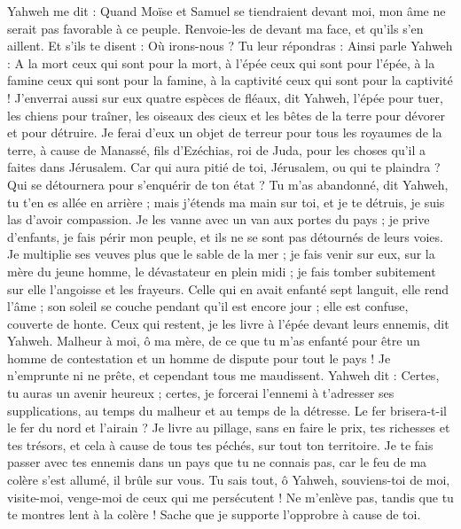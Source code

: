 \begin{multicols}{2}
\VerseOne{}Yahweh me dit : Quand Moïse et Samuel se tiendraient devant moi, mon âme ne serait pas favorable à ce peuple. Renvoie-les de devant ma face, et qu'ils s’en aillent.
Et s'ils te disent : Où irons-nous ? Tu leur répondras : Ainsi parle Yahweh : A la mort ceux qui sont pour la mort, à l’épée ceux qui sont pour l’épée, à la famine ceux qui sont pour la famine, à la captivité ceux qui sont pour la captivité !
J'enverrai aussi sur eux quatre espèces de fléaux, dit Yahweh, l'épée pour tuer, les chiens pour traîner, les oiseaux des cieux et les bêtes de la terre pour dévorer et pour détruire.
Je ferai d’eux un objet de terreur pour tous les royaumes de la terre, à cause de Manassé, fils d'Ezéchias, roi de Juda, pour les choses qu'il a faites dans Jérusalem.
Car qui aura pitié de toi, Jérusalem, ou qui te plaindra ? Qui se détournera pour s'enquérir de ton état ?
Tu m'as abandonné, dit Yahweh, tu t'en es allée en arrière ; mais j'étends ma main sur toi, et je te détruis, je suis las d’avoir compassion.
Je les vanne avec un van aux portes du pays ; je prive d’enfants, je fais périr mon peuple, et ils ne se sont pas détournés de leurs voies.
Je multiplie ses veuves plus que le sable de la mer ; je fais venir sur eux, sur la mère du jeune homme, le dévastateur en plein midi ; je fais tomber subitement sur elle l'angoisse et les frayeurs.
Celle qui en avait enfanté sept languit, elle rend l'âme ; son soleil se couche pendant qu'il est encore jour ; elle est confuse, couverte de honte. Ceux qui restent, je les livre à l'épée devant leurs ennemis, dit Yahweh.
Malheur à moi, ô ma mère, de ce que tu m'as enfanté pour être un homme de contestation et un homme de dispute pour tout le pays ! Je n’emprunte ni ne prête, et cependant tous me maudissent.
Yahweh dit : Certes, tu auras un avenir heureux ; certes, je forcerai l’ennemi à t’adresser ses supplications, au temps du malheur et au temps de la détresse.
Le fer brisera-t-il le fer du nord et l'airain ?
Je livre au pillage, sans en faire le prix, tes richesses et tes trésors, et cela à cause de tous tes péchés, sur tout ton territoire.
Je te fais passer avec tes ennemis dans un pays que tu ne connais pas, car le feu de ma colère s’est allumé, il brûle sur vous.
Tu sais tout, ô Yahweh, souviens-toi de moi, visite-moi, venge-moi de ceux qui me persécutent ! Ne m'enlève pas, tandis que tu te montres lent à la colère ! Sache que je supporte l’opprobre à cause de toi.

\end{multicols}
